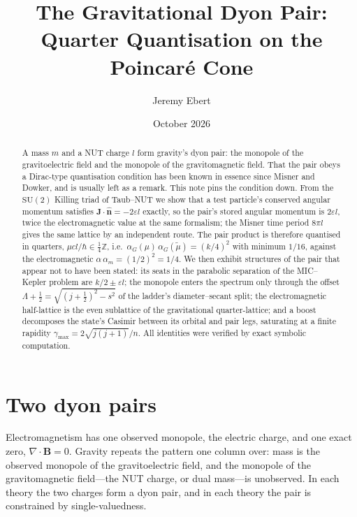 \documentclass[11pt]{article}
\title{The Gravitational Dyon Pair:\\ Quarter Quantisation on the Poincar\'e Cone}
\author{Jeremy Ebert}
\date{October 2026}
\numberwithin{equation}{section}
\newcommand{\eps}{\varepsilon}
\newcommand{\ZZ}{\mathbb{Z}}
\begin{document}
\maketitle

\begin{abstract}
A mass $m$ and a NUT charge $l$ form gravity's dyon pair: the monopole of the
gravitoelectric field and the monopole of the gravitomagnetic field. That the
pair obeys a Dirac-type quantisation condition has been known in essence
since Misner and Dowker, and is usually left as a remark. This note pins the
condition down. From the $\mathrm{SU}(2)$ Killing triad of Taub--NUT we show
that a test particle's conserved angular momentum satisfies
$\mathbf{J}\cdot\hat{\mathbf{n}}=-2\eps l$ exactly, so the pair's stored
angular momentum is $2\eps l$, twice the electromagnetic value at the same
formalism; the Misner time period $8\pi l$ gives the same lattice by an
independent route. The pair product is therefore quantised in quarters,
$\mu c l/\hbar\in\tfrac14\ZZ$, i.e.\ $\alpha_G(\mu)\,\alpha_G(\tilde\mu)
=(k/4)^2$ with minimum $1/16$, against the electromagnetic
$\alpha\,\alpha_m=(1/2)^2=1/4$. We then exhibit structures of the pair
that appear not to have been stated: its seats in the parabolic separation of
the MIC--Kepler problem are $k/2\pm\eps l$; the monopole enters the spectrum
only through the offset $\Lambda+\tfrac12=\sqrt{(j+\tfrac12)^2-s^2}$ of the
ladder's diameter--secant split; the electromagnetic half-lattice
is the even sublattice of the gravitational quarter-lattice; and a boost
decomposes the state's Casimir between its orbital and pair legs, saturating
at a finite rapidity $\gamma_{\max}=2\sqrt{j(j+1)}/n$. All identities were
verified by exact symbolic computation.
\end{abstract}

\section{Two dyon pairs}

Electromagnetism has one observed monopole, the electric charge, and one
exact zero, $\nabla\!\cdot\!\mathbf{B}=0$. Gravity repeats the pattern one
column over: mass is the observed monopole of the gravitoelectric field, and
the monopole of the gravitomagnetic field---the NUT charge, or dual
mass---is unobserved. In each theory the two charges form a dyon pair, and
in each theory the pair is constrained by single-valuedness.
\end{document}
